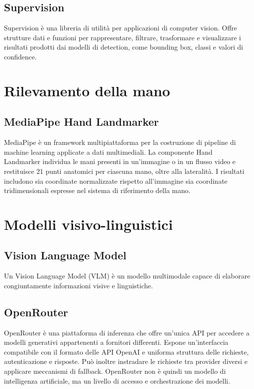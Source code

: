 \subsection{Supervision}
Supervision è una libreria di utilità per applicazioni di computer vision.
Offre strutture dati e funzioni per rappresentare, filtrare, trasformare e
visualizzare i risultati prodotti dai modelli di detection, come bounding box,
classi e valori di confidence.

\section{Rilevamento della mano}

\subsection{MediaPipe Hand Landmarker}
MediaPipe è un framework multipiattaforma per la costruzione di pipeline di
machine learning applicate a dati multimediali. La componente Hand Landmarker
individua le mani presenti in un'immagine o in un flusso video e restituisce 21
punti anatomici per ciascuna mano, oltre alla lateralità. I risultati includono
sia coordinate normalizzate rispetto all'immagine sia coordinate
tridimensionali espresse nel sistema di riferimento della mano.

\section{Modelli visivo-linguistici}

\subsection{Vision Language Model}
Un Vision Language Model (VLM) è un modello multimodale capace di elaborare
congiuntamente informazioni visive e linguistiche.

\subsection{OpenRouter}
OpenRouter è una piattaforma di inferenza che offre un'unica API per accedere a
modelli generativi appartenenti a fornitori differenti. Espone un'interfaccia
compatibile con il formato delle API OpenAI e uniforma struttura delle
richieste, autenticazione e risposte. Può inoltre instradare le richieste tra
provider diversi e applicare meccanismi di fallback. OpenRouter non è quindi
un modello di intelligenza artificiale, ma un livello di accesso e
orchestrazione dei modelli.

